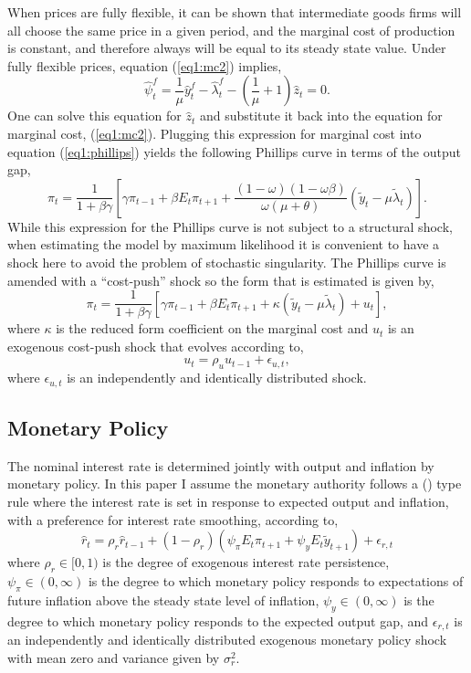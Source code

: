 \documentclass[11pt]{article}
\newcommand{\beq}{\begin{equation}}
\newcommand{\eeq}{\end{equation}}
\newcommand{\bdm}{\begin{displaymath}}
\newcommand{\edm}{\end{displaymath}}
\newcommand{\citee}[1]{\citeauthor*{#1} (\citeyear{#1})}
\newcommand{\h}[1]{\hat{#1}}
\begin{document}
When prices are fully flexible, it can be shown that intermediate goods firms will all choose the same price in a given period, and the marginal cost of production is constant, and therefore always will be equal to its steady state value.  Under fully flexible prices, equation (\ref{eq1:mc2}) implies,
\bdm \h{\psi}_t^f = \frac{1}{\mu} \h{y}_t^f - \h{\lambda}_t^f - \left(\frac{1}{\mu} + 1\right) \h{z}_t = 0. \edm
One can solve this equation for $\h{z}_t$ and substitute it back into the equation for marginal cost, (\ref{eq1:mc2}).  Plugging this expression for marginal cost into equation (\ref{eq1:phillips}) yields the following Phillips curve in terms of the output gap,
\bdm \label{eq1:phillips1} \pi_t = \frac{1}{1+\beta \gamma} \left[ \gamma \pi_{t-1} + \beta E_t \pi_{t+1} + \frac{(1-\omega)(1-\omega \beta)}{\omega (\mu + \theta)} (\tilde{y}_t - \mu \tilde{\lambda}_t) \right]. \edm
While this expression for the Phillips curve is not subject to a structural shock, when estimating the model by maximum likelihood it is convenient to have a shock here to avoid the problem of stochastic singularity.  The Phillips curve is amended with a ``cost-push'' shock so the form that is estimated is given by,
\beq \label{eq1:gapphillips} \pi_t = \frac{1}{1+\beta \gamma} \left[ \gamma \pi_{t-1} + \beta E_t \pi_{t+1} + \kappa (\tilde{y}_t - \mu \tilde{\lambda}_t) + u_t\right], \eeq
where $\kappa$ is the reduced form coefficient on the marginal cost and $u_t$ is an exogenous cost-push shock that evolves according to,
\beq \label{eq1:costpush} u_t = \rho_u u_{t-1} + \epsilon_{u,t}, \eeq
where $\epsilon_{u,t}$ is an independently and identically distributed shock.

\subsection{Monetary Policy}
The nominal interest rate is determined jointly with output and inflation by monetary policy.  In this paper I assume the monetary authority follows a \citee{taylor1993} type rule where the interest rate is set in response to expected output and inflation, with a preference for interest rate smoothing, according to,
\beq \label{eq1:taylor} \h{r}_t = \rho_r \h{r}_{t-1} + (1-\rho_r) \left(\psi_{\pi} E_t \pi_{t+1} + \psi_y E_t \tilde{y}_{t+1} \right) + \epsilon_{r,t} \eeq
where $\rho_r \in [0,1)$ is the degree of exogenous interest rate persistence, $\psi_{\pi} \in (0,\infty)$ is the degree to which monetary policy responds to expectations of future inflation above the steady state level of inflation, $\psi_y \in (0,\infty)$ is the degree to which monetary policy responds to the expected output gap, and $\epsilon_{r,t}$ is an independently and identically distributed exogenous monetary policy shock with mean zero and variance given by $\sigma_r^2$.  
\end{document}
